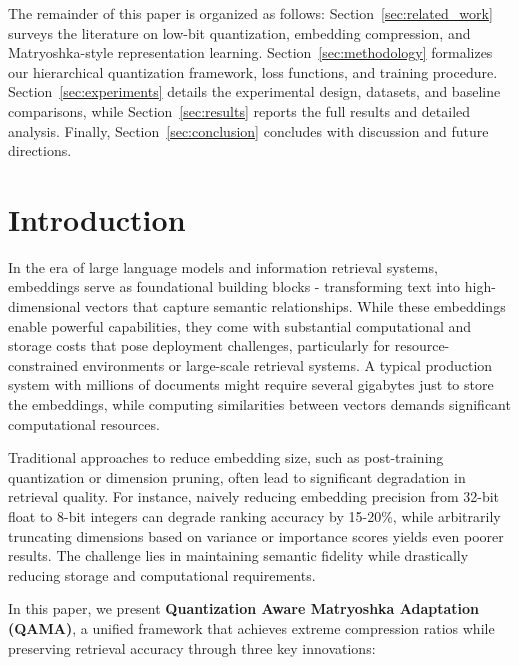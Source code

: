 The remainder of this paper is organized as follows: Section~\ref{sec:related_work} surveys the literature on low-bit quantization, embedding compression, and Matryoshka-style representation learning. Section~\ref{sec:methodology} formalizes our hierarchical quantization framework, loss functions, and training procedure. Section~\ref{sec:experiments} details the experimental design, datasets, and baseline comparisons, while Section~\ref{sec:results} reports the full results and detailed analysis. Finally, Section~\ref{sec:conclusion} concludes with discussion and future directions.



\section{Introduction}

In the era of large language models and information retrieval systems, embeddings serve as foundational building blocks - transforming text into high-dimensional vectors that capture semantic relationships. While these embeddings enable powerful capabilities, they come with substantial computational and storage costs that pose deployment challenges, particularly for resource-constrained environments or large-scale retrieval systems. A typical production system with millions of documents might require several gigabytes just to store the embeddings, while computing similarities between vectors demands significant computational resources.

Traditional approaches to reduce embedding size, such as post-training quantization or dimension pruning, often lead to significant degradation in retrieval quality. For instance, naively reducing embedding precision from 32-bit float to 8-bit integers can degrade ranking accuracy by 15-20\%, while arbitrarily truncating dimensions based on variance or importance scores yields even poorer results. The challenge lies in maintaining semantic fidelity while drastically reducing storage and computational requirements.

In this paper, we present \textbf{Quantization Aware Matryoshka Adaptation (QAMA)}, a unified framework that achieves extreme compression ratios while preserving retrieval accuracy through three key innovations:

